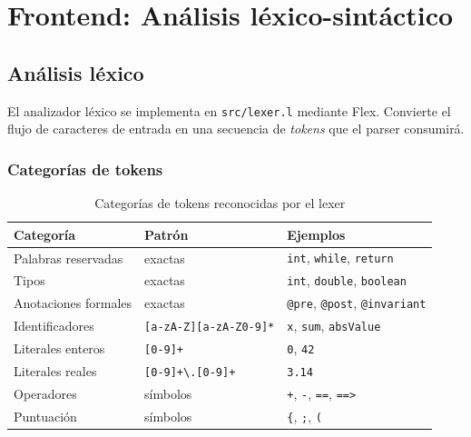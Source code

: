 \chapter{Frontend: An\'alisis l\'exico-sint\'actico}
\label{chap:frontend}

\section{An\'alisis l\'exico}

El analizador l\'exico se implementa en \texttt{src/lexer.l} mediante Flex.
Convierte el flujo de caracteres de entrada en una secuencia de \emph{tokens}
que el parser consumir\'a.

\subsection{Categor\'ias de tokens}

\begin{table}[H]
  \centering
  \caption{Categor\'ias de tokens reconocidas por el lexer}
  \label{tab:tokens}
  \begin{tabular}{llp{6cm}}
    \toprule
    \textbf{Categor\'ia} & \textbf{Patr\'on} & \textbf{Ejemplos} \\
    \midrule
    Palabras reservadas & exactas       & \texttt{int}, \texttt{while}, \texttt{return} \\
    Tipos               & exactas       & \texttt{int}, \texttt{double}, \texttt{boolean} \\
    Anotaciones formales& exactas       & \texttt{@pre}, \texttt{@post}, \texttt{@invariant} \\
    Identificadores     & \texttt{[a-zA-Z][a-zA-Z0-9]*} & \texttt{x}, \texttt{sum}, \texttt{absValue} \\
    Literales enteros   & \texttt{[0-9]+}               & \texttt{0}, \texttt{42} \\
    Literales reales    & \texttt{[0-9]+\textbackslash.[0-9]+} & \texttt{3.14} \\
    Operadores          & s\'imbolos    & \texttt{+}, \texttt{-}, \texttt{==}, \texttt{==>} \\
    Puntuaci\'on        & s\'imbolos    & \texttt{\{}, \texttt{;}, \texttt{(} \\
    \bottomrule
  \end{tabular}
\end{table}

